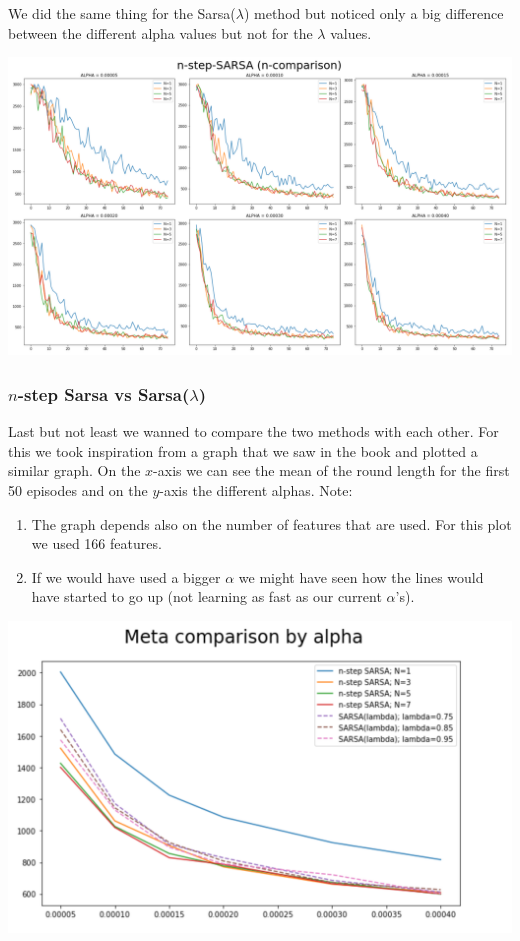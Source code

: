 We did the same thing for the Sarsa($\lambda$) method but noticed only a big difference between the different alpha values but not for the $\lambda$ values.
\begin{center}
\includegraphics[scale=0.22]{graphics/plot08.png}
\end{center}

\subsubsection*{$n$-step Sarsa vs Sarsa($\lambda$)}
Last but not least we wanned to compare the two methods with each other. For this we took inspiration from a graph that we saw in the book \cite{Sutton1998} and plotted a similar graph. On the $x$-axis we can see the mean of the round length for the first 50 episodes and on the $y$-axis the different alphas. Note:
\begin{enumerate}
\item The graph depends also on the number of features that are used. For this plot we used 166 features. 
\item If we would have used a bigger $\alpha$ we might have seen how the lines would have started to go up (not learning as fast as our current $\alpha$'s).
\end{enumerate}
\begin{center}
\includegraphics[scale=0.22]{graphics/plot09.png}
\end{center}


